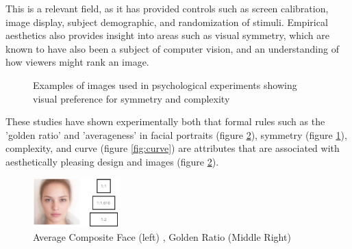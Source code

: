 This is a relevant field, as it has provided  controls such as screen calibration, image display, subject demographic, and randomization of stimuli\cite{Leder2019,Mullennix2013, Rolls2014}. Empirical aesthetics also provides insight into areas such as visual symmetry, which are known to have also been a subject of computer vision\cite{Elawady2017,Gray2010}, and an understanding of how viewers might rank an image. 
\begin{figure}[H]
\centering
{}
\caption{Examples of images used in psychological experiments showing visual preference for symmetry and complexity      \cite{Bertamini2013}}
\label{fig:symetry}
\end{figure}


These studies have shown experimentally both that formal rules such as the 'golden ratio' and 'averageness' in facial portraits (figure \ref{fig:means}), symmetry (figure \ref{fig:symetry}), complexity\cite{Bertamini2013}, and curve (figure \ref{fig:curve}) are attributes that are associated with aesthetically pleasing design and images (figure \ref{fig:means}).

\begin{figure}[ht!]
    \centering
    \includegraphics[width=0.3\textwidth]{figures/introduction/imperical aesthetics/means.png}
    \caption{Average Composite Face (left) , Golden Ratio (Middle Right) \cite{Brielmann2018}}
    \label{fig:means}
\end{figure}


